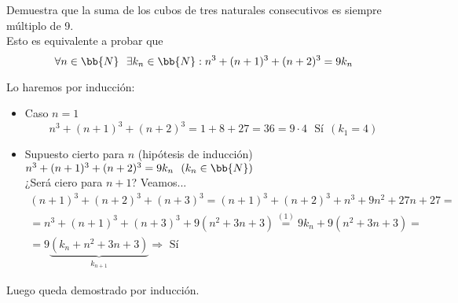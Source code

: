 \documentclass[12pt]{article}
\begin{document}
    \begin{ejercicio}
        [2.5 puntos] Demuestra que la suma de los cubos de tres naturales consecutivos es siempre múltiplo de 9.\\

        Esto es equivalente a probar que 
        \[
            \forall n \in \bb{N} \ \ \exists k_n \in \bb{N} : n^3 + (n+1)^3 + (n+2)^3 = 9k_n
        \]

        Lo haremos por inducción:
        \begin{itemize}[label=$\ast$]
            \item Caso $n=1$\\
            \[
                n^3 + (n+1)^3 + (n+2)^3 = 1 + 8 + 27=36 = 9 \cdot 4 \ \ \ \text{Sí} \ \ (k_1=4)
            \]

            \item Supuesto cierto para $n$ (hipótesis de inducción) $n^3 + (n+1)^3 + (n+2)^3 = 9k_n\ \ (k_n \in \bb{N})$\\
            ¿Será ciero para $n+1$? Veamos...
            \begin{gather*}
                (n+1)^3+(n+2)^3+(n+3)^3 = (n+1)^3+(n+2)^3+n^3 + 9 n^2 + 27n + 27 =\\
                = n^3 + (n+1) ^3 + (n+3)^3 + 9(n^2 + 3n + 3) \stackrel{(1)}{=} 9 k_n + 9(n^2 + 3n + 3) =\\
                = 9\underbrace{(k_n + n^2 + 3n + 3)}_{k_{n+1}} \Longrightarrow \text{ Sí}
            \end{gather*}
        \end{itemize}

        Luego queda demostrado por inducción.
    \end{ejercicio}
        
\end{document}
